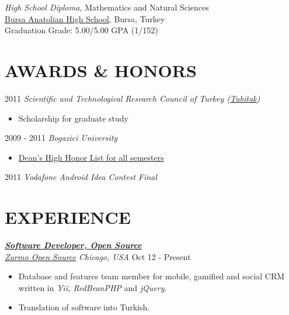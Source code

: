 \documentclass[line, margin]{res}
\begin{document}
\begin{resume}
	{\sl High School Diploma,} Mathematics and Natural Sciences \\
	\href{http://www.bursaanadolulisesi.k12.tr/}{Bursa Anatolian High School}, Bursa, Turkey \\
	Graduation Grade: 5.00/5.00 GPA (1/152)               

\vspace{-0.2cm}

\section{AWARDS \& HONORS}
	2011 {\sl Scientific and Technological Research Council of Turkey 						(\href{http://www.tubitak.gov.tr/en/ot/10/}{Tubitak})} \\
	\vspace{-.3cm}				
	\begin{itemize} 
		\item Scholarship for graduate study
	\end{itemize}
	
	\vspace{-0.4cm}			
	2009 - 2011 {\sl Bogazici University }
	\begin{itemize} \itemsep -2pt
		\item \href{http://www.eng.boun.edu.tr/current_students.html}{Dean's High Honor List for all semesters}	
	\end{itemize}

  \vspace{-0.4cm}
	2011 {\sl Vodafone Android Idea Contest Final} \\
 
\vspace{-0.4cm} 

\section{EXPERIENCE}

  {\sl \textbf{\href{https://bitbucket.org/zurmo/}{Software Developer, Open Source}} \\ \href{http://zurmo.org}{Zurmo Open Source} Chicago, USA} \hfill Oct 12 - Present \\
  \vspace{-0.3cm}
  \begin{itemize}
    \item Database and features team member for mobile, gamified and social CRM written in   \textit{Yii, RedBeanPHP} and \textit{jQuery}.
    \item Translation of software into Turkish.
  \end{itemize}


\end{resume}
\end{document}
